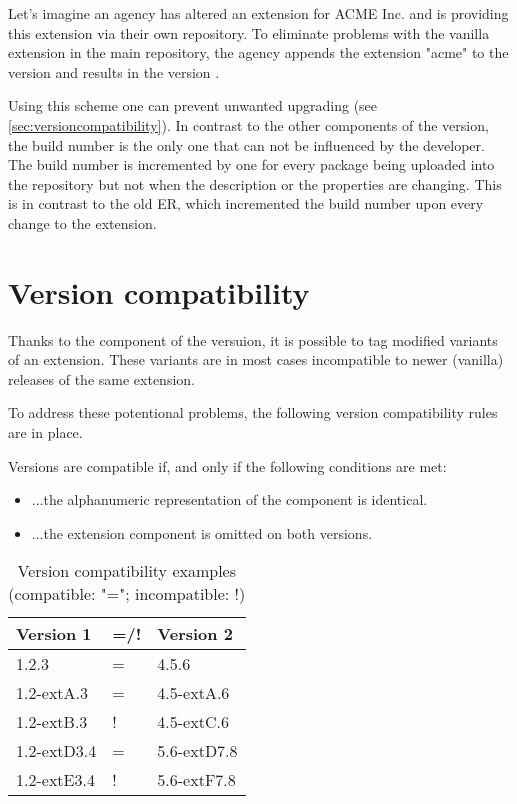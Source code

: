 Let's imagine an agency has altered an extension for ACME Inc. and is providing this extension via their own repository.
To eliminate problems with the vanilla extension in the main repository, the agency appends the extension "acme" to the version and results in the version
.

Using this scheme one can prevent unwanted upgrading (see \ref{sec:versioncompatibility}). In contrast to the other components of the version, the build number is the only one that can not be influenced by the developer. The build number is incremented by one for every package being uploaded into the repository but not when the description or the properties are changing. This is in contrast to the old ER, which incremented the build number upon every change to the extension.

\section[sec:versioncompatibility]{Version compatibility}
Thanks to the  component of the versuion, it is possible to tag modified variants of an extension. These variants are in most cases incompatible to newer (vanilla) releases of the same extension.

To address these potentional problems, the following version compatibility rules are in place.

Versions are compatible if, and only if the following conditions are met:
\begin{itemize}
  \item ...the alphanumeric representation of the  component is identical.
  \item ...the extension component is omitted on both versions.
\end{itemize}

\small
\begin{longtable}{|p{}|p{}|p{}|}
\caption{Version compatibility examples (compatible: "="; incompatible: !)} \\
\hline
\label{tab:versioncompatexamples}
\textbf{Version 1} & \textbf{=/!} & \textbf{Version 2} \\
\hline
 1.2.3 & = & 4.5.6
\\ \hline
 1.2-extA.3 & = & 4.5-extA.6
\\ \hline
 1.2-extB.3 & ! & 4.5-extC.6
\\ \hline
 1.2-extD3.4 & = & 5.6-extD7.8
\\ \hline
 1.2-extE3.4 & ! & 5.6-extF7.8
\\ \hline
\end{longtable}
\normalsize

